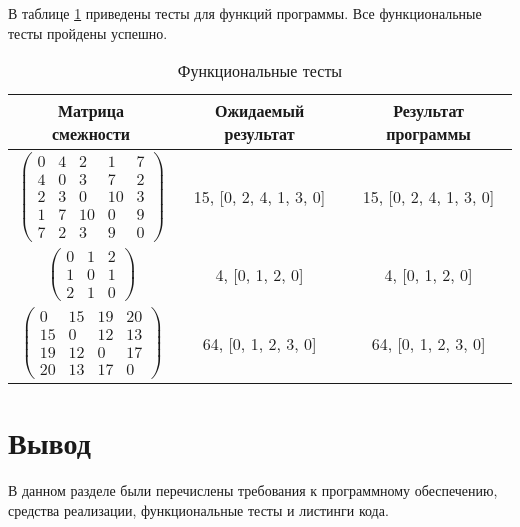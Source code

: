 В таблице \ref{tbl:functional_test} приведены тесты для функций программы. Все функциональные тесты пройдены успешно.

\begin{table}[ht]
	\small
	\begin{center}
		\begin{threeparttable}
			\caption{Функциональные тесты}
			\label{tbl:functional_test}
			\begin{tabular}{|c|c|c|}
				\hline
				Матрица смежности & Ожидаемый результат & Результат программы \\
				\hline
				$\begin{pmatrix}
					0 &  4 &  2 &  1 & 7 \\
					4 &  0 &  3 &  7 & 2 \\
					2 &  3 &  0 & 10 & 3 \\
					1 &  7 & 10 &  0 & 9 \\
					7 &  2 &  3 &  9 & 0
				\end{pmatrix}$ &
				15, [0, 2, 4, 1, 3, 0] & 15, [0, 2, 4, 1, 3, 0] \\ \hline
				
				$ \begin{pmatrix}
					0 & 1 & 2 \\
					1 & 0 & 1 \\
					2 & 1 & 0	
				\end{pmatrix}$ &
				4, [0, 1, 2, 0] &
				4, [0, 1, 2, 0] \\ \hline
				
				$ \begin{pmatrix}
					0 & 15 & 19 & 20 \\
					15 &  0 & 12 & 13 \\
					19 & 12 &  0 & 17 \\
					20 & 13 & 17 &  0
				\end{pmatrix}$ &
				64, [0, 1, 2, 3, 0] &
				64, [0, 1, 2, 3, 0] \\ \hline
			\end{tabular}	
		\end{threeparttable}
	\end{center}
\end{table}

\section*{Вывод}

В данном разделе были перечислены требования к программному обеспечению, средства реализации, функциональные тесты и листинги кода.

    